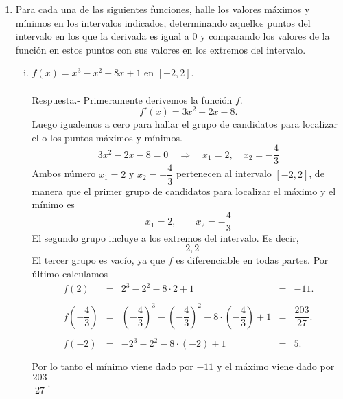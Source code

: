 \begin{enumerate}[\bfseries 1.]

    \item Para cada una de las siguientes funciones, halle los valores máximos y mínimos en los intervalos indicados, determinando aquellos puntos del intervalo en los que la derivada es igual a $0$ y comparando los valores de la función en estos puntos con sus valores en los extremos del intervalo.
	\begin{enumerate}[(i)]

	    \item $f(x)=x^3-x^2-8x+1$ en $[-2,2]$.\\\\
		Respuesta.-\; Primeramente derivemos la función $f$.
		$$f'(x)=3x^2-2x-8.$$
		Luego igualemos a cero para hallar el grupo de candidatos para localizar el o los puntos máximos y mínimos.
		$$3x^2-2x-8=0 \quad \Rightarrow \quad x_1=2,\quad x_2=-\dfrac{4}{3}$$
		Ambos número $x_1=2$ y $x_2=-\dfrac{4}{3}$ pertenecen al intervalo $[-2,2]$, de manera que el primer grupo de candidatos para localizar el máximo y el mínimo es
		$$x_1=2,\qquad x_2=-\dfrac{4}{3}$$
		El segundo grupo incluye a los extremos del intervalo. Es decir,
		$$-2,2$$
		El tercer grupo es vacío, ya que $f$ es diferenciable en todas partes. Por último calculamos 
		$$\begin{array}{ccccl}
		    f\left(2\right) &=& 2^3-2^2-8\cdot 2+1&=&-11.\\\\
		    f\left(-\dfrac{4}{3}\right) &=& \left(-\dfrac{4}{3}\right)^3-\left(-\dfrac{4}{3}\right)^2-8\cdot \left(-\dfrac{4}{3}\right)+1&=&\dfrac{203}{27}.\\\\
		    f\left(-2\right) &=& -2^3-2^2-8\cdot (-2)+1&=&5.\\\\
		\end{array}$$
		Por lo tanto el mínimo viene dado por $-11$ y el máximo viene dado por $\dfrac{203}{27}.$\\\\


\end{enumerate}
\end{enumerate}
